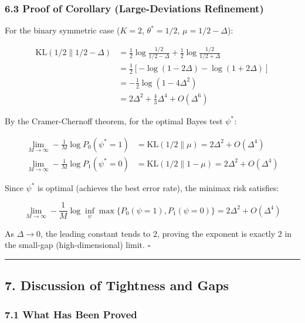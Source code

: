 \documentclass[
  12pt,
]{ctexart}
\begin{document}
\subsubsection{6.3 Proof of Corollary (Large-Deviations
Refinement)}\label{proof-of-corollary-large-deviations-refinement}

For the binary symmetric case (\(K=2\), \(\theta^* = 1/2\),
\(\mu = 1/2 - \Delta\)):

\[\begin{aligned}
\text{KL}(1/2 \parallel 1/2 - \Delta) &= \frac{1}{2}\log\frac{1/2}{1/2-\Delta} + \frac{1}{2}\log\frac{1/2}{1/2+\Delta} \\
&= \frac{1}{2}\left[-\log(1-2\Delta) - \log(1+2\Delta)\right] \\
&= -\frac{1}{2}\log(1 - 4\Delta^2) \\
&= 2\Delta^2 + \frac{4}{3}\Delta^4 + O(\Delta^6)
\end{aligned}\]

By the Cramer-Chernoff theorem, for the optimal Bayes test \(\psi^*\):

\[\begin{aligned}
\lim_{M \to \infty} -\frac{1}{M}\log P_0(\psi^*=1) &= \text{KL}(1/2 \parallel \mu) = 2\Delta^2 + O(\Delta^4) \\
\lim_{M \to \infty} -\frac{1}{M}\log P_1(\psi^*=0) &= \text{KL}(1/2 \parallel 1-\mu) = 2\Delta^2 + O(\Delta^4)
\end{aligned}\]

Since \(\psi^*\) is optimal (achieves the best error rate), the minimax
risk satisfies:

\[\lim_{M \to \infty} -\frac{1}{M}\log \inf_{\psi} \max\{P_0(\psi=1), P_1(\psi=0)\} = 2\Delta^2 + O(\Delta^4)\]

As \(\Delta \to 0\), the leading constant tends to \(2\), proving the
exponent is exactly \(2\) in the small-gap (high-dimensional) limit.
\(\square\)

\begin{center}\rule{0.5\linewidth}{0.5pt}\end{center}

\subsection{7. Discussion of Tightness and
Gaps}\label{discussion-of-tightness-and-gaps}

\subsubsection{7.1 What Has Been Proved}\label{what-has-been-proved}
\end{document}
